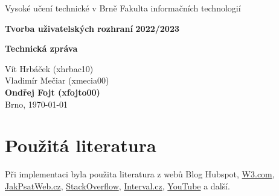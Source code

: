 \documentclass[12pt,a4paper]{article}
\begin{document}
    \pagestyle{empty}
    \begin{titlepage}
        \begin{center}
            \normalsize{Vysoké učení technické v Brně\linebreak}
            \normalsize{Fakulta informačních technologií}

            \vfill

            \large\textbf{Tvorba uživatelských rozhraní\linebreak}
            \large\textbf{2022/2023}

            \vfill

            \LARGE\textbf{Technická zpráva\linebreak}

            \vfill
            \vfill
            \vfill


            \begin{flushleft}
                \large
                Vít Hrbáček (xhrbac10)\\
                Vladimír Mečiar (xmecia00)\\
                \textbf{Ondřej Fojt (xfojto00)}\\
                \hfill
                Brno, \today
            \end{flushleft}
        \end{center}
    \end{titlepage}
    \pagestyle{plain}
    \newpage

    \tableofcontents
    \newpage


    
    
    
    
    
    
    
    \section{Použitá literatura}
    Při implementaci byla použita literatura z webů Blog Hubspot, \hyperlink{https://www.w3schools.com/js/js_arrays.asp}{W3.com}, \hyperlink{https://www.jakpsatweb.cz/javascript/objekt-date.html}{JakPsatWeb.cz}, \hyperlink{https://stackoverflow.com/questions/7755088/what-does-href-expression-a-href-javascript-a-do}{StackOverflow}, \hyperlink{https://www.interval.cz/clanky/promenne-v-javascriptu/}{Interval.cz}, \hyperlink{https://www.youtube.com/playlist?list=PLillGF-RfqbYJVXBgZ_nA7FTAAEpp_IAc}{YouTube} a další.
\end{document}

